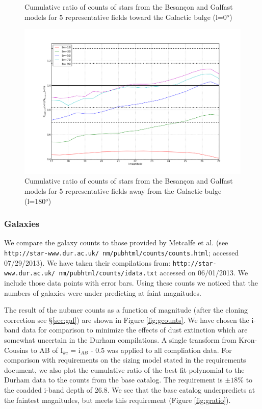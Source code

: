 \documentclass[]{article}
\begin{document}
{\begin{figure}[H]
\caption{Cumulative ratio of counts of stars from the Besan\c{c}on and Galfast models for 5 representative fields toward the Galactic bulge (l=0$^o$) \label{fig:sratio_0}}
\end{figure}
\begin{figure}[H]
\centering
\includegraphics[width=5in]{validation_figures/cumulative_ratio_stars_180_besancon_dust.png}
\caption{Cumulative ratio of counts of stars from the Besan\c{c}on and Galfast models for 5 representative fields away from the Galactic bulge (l=180$^o$) \label{fig:sratio_180}}
\end{figure}

\subsubsection{Galaxies \label{sec:galaxycounts}}
We compare the galaxy counts to those provided by Metcalfe et al. (see {\tt http://star-www.dur.ac.uk/~nm/pubhtml/counts/counts.html}; 
accessed 07/29/2013).  We have taken their compilations from:
{\tt http://star-www.dur.ac.uk/~nm/pubhtml/counts/idata.txt} accessed on 06/01/2013.  
We include those data points with error bars.  
Using these counts
we noticed that the numbers of galaxies were under predicting at faint magnitudes.  

The result of the nubmer counts as a function of magnitude (after the cloning correction see \S \ref{sec:gal}) are shown in Figure \ref{fig:gcounts}.  
We have chosen the i-band data for comparison to 
minimize the effects of dust extinction which are somewhat uncertain in the Durham compilations.  A single transform from Kron-Cousins to AB of I$_{kc}$ = i$_{AB}$ - 0.5 was applied to
all compliation data.  For comparison with requirements on the sizing model stated in the requirements document, we also plot the cumulative ratio of the best fit polynomial
to the Durham data to the counts from the base catalog.  The requirement is $\pm18\%$ to the coadded i-band depth of 26.8.  We see that the base catalog
underpredicts at the faintest magnitudes, but meets this requirement (Figure \ref{fig:gratio}).

}
\end{document}
